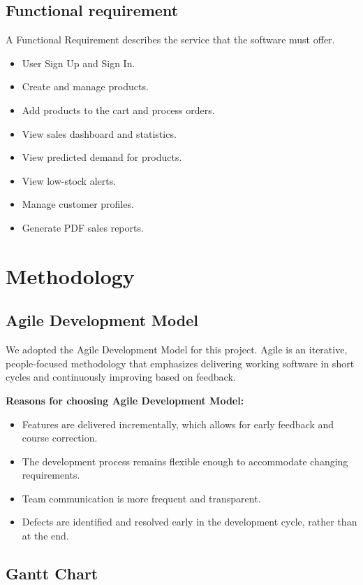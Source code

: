 \documentclass[12pt,a4paper]{report}
\begin{document}
\subsection{Functional requirement}
A Functional Requirement describes the service that the software must offer.
\begin{itemize}
    \item User Sign Up and Sign In.
    \item Create and manage products.
    \item Add products to the cart and process orders.
    \item View sales dashboard and statistics.
    \item View predicted demand for products.
    \item View low-stock alerts.
    \item Manage customer profiles.
    \item Generate PDF sales reports.
\end{itemize}

\section{Methodology}

\subsection{Agile Development Model}
We adopted the Agile Development Model for this project. Agile is an iterative, people-focused methodology that emphasizes delivering working software in short cycles and continuously improving based on feedback.

\textbf{Reasons for choosing Agile Development Model:}
\begin{itemize}
    \item Features are delivered incrementally, which allows for early feedback and course correction.
    \item The development process remains flexible enough to accommodate changing requirements.
    \item Team communication is more frequent and transparent.
    \item Defects are identified and resolved early in the development cycle, rather than at the end.
\end{itemize}

\subsection{Gantt Chart}
\end{document}
